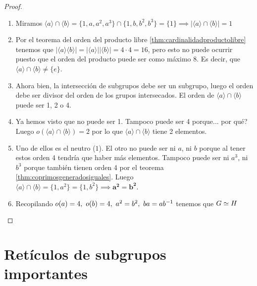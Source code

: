 \begin{proof}
\begin{enumerate}
\begin{itemize}
			\begin{enumerate}
				\item Miramos $\langle a \rangle \cap \langle b \rangle = \{1, a, a^2, a^3\} \cap \{1, b, b^2, b^3\} = \{1\} \implies |\langle a \rangle \cap \langle b \rangle| = 1$
				\item Por el teorema del orden del producto libre \ref{thm:cardinalidadproductolibre} tenemos que $|\langle a \rangle \langle b \rangle| = |\langle a \rangle ||\langle b \rangle| = 4 \cdot 4 = 16$, pero esto no puede ocurrir puesto que el orden del producto puede ser como máximo $8$. Es decir, que $\langle a \rangle \cap \langle b \rangle \neq \{e\}$.
				\item Ahora bien, la intersección de subgrupos debe ser un subgrupo, luego el orden debe ser divisor del orden de los grupos intersecados. El orden de $\langle a \rangle \cap \langle b \rangle$ puede ser 1, 2 o 4.
				\item Ya hemos visto que no puede ser 1. Tampoco puede ser 4 porque... por qué? Luego $o(\langle a \rangle \cap \langle b \rangle) = 2$ por lo que $\langle a \rangle \cap \langle b \rangle$ tiene 2 elementos.
				\item Uno de ellos es el neutro ($1$). El otro no puede ser ni $a$, ni $b$ porque al tener estos orden 4 tendría que haber más elementos. Tampoco puede ser ni $a^3$, ni $b^3$ porque también tienen orden 4 por el teorema \ref{thm:coprimosgeneradosiguales}. Luego $\langle a \rangle \cap \langle b \rangle = \{1, a^2\} = \{1, b^2\} \implies \mathbf{a^2 = b^2}$.
				\item Recopilando $o(a) = 4,\ o(b) = 4,\ a^2 = b^2,\ ba = ab^{-1}$ tenemos que $G \simeq H \qedhere$
			\end{enumerate}
		\end{itemize}
	\end{enumerate}
\end{proof}


\section{Retículos de subgrupos importantes}

